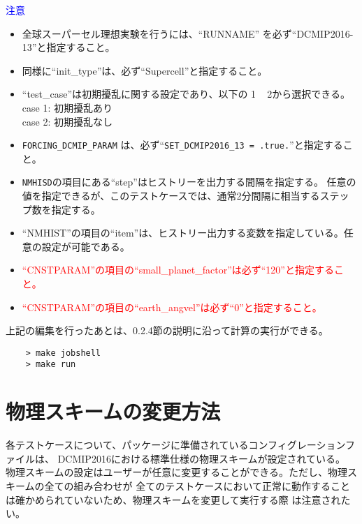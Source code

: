  \noindent \textcolor{blue}{{\sf 注意}}
 \begin{itemize}
   \item 全球スーパーセル理想実験を行うには、``RUNNAME'' を必ず``DCMIP2016-13''と指定すること。
   \item 同様に``init\_type''は、必ず``Supercell''と指定すること。
   \item ``test\_case''は初期擾乱に関する設定であり、以下の 1 ~ 2から選択できる。\\
          case 1: 初期擾乱あり \\
          case 2: 初期擾乱なし
   \item \verb|FORCING_DCMIP_PARAM| は、必ず``\verb|SET_DCMIP2016_13 = .true.|''と指定すること。
   \item \verb|NMHISD|の項目にある``step''はヒストリーを出力する間隔を指定する。
           任意の値を指定できるが、このテストケースでは、通常2分間隔に相当するステップ数を指定する。
   \item ``NMHIST''の項目の``item''は、ヒストリー出力する変数を指定している。任意の設定が可能である。
   \item \textcolor{red}{``CNSTPARAM''の項目の``small\_planet\_factor''は必ず``120''と指定すること。}
   \item \textcolor{red}{``CNSTPARAM''の項目の``earth\_angvel''は必ず``0''と指定すること。}
 \end{itemize}

 \noindent 上記の編集を行ったあとは、0.2.4節の説明に沿って計算の実行ができる。
 \begin{verbatim}
    > make jobshell
    > make run
 \end{verbatim}


\section{物理スキームの変更方法}

 \noindent 各テストケースについて、パッケージに準備されているコンフィグレーションファイルは、
DCMIP2016における標準仕様の物理スキームが設定されている。
物理スキームの設定はユーザーが任意に変更することができる。ただし、物理スキームの全ての組み合わせが
全てのテストケースにおいて正常に動作することは確かめられていないため、物理スキームを変更して実行する際
は注意されたい。\\



